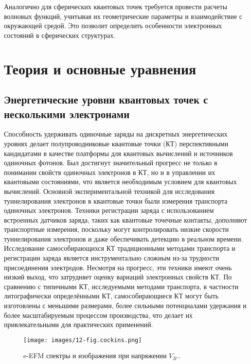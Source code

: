 \documentclass[a4paper,14pt]{extarticle}
\begin{document}
Аналогично для сферических квантовых точек требуется провести расчеты волновых функций, учитывая их геометрические параметры и взаимодействие с окружающей средой. Это позволит определить особенности электронных состояний в сферических структурах.

\pagebreak
\section{Теория и основные уравнения}

\subsection{Энергетические уровни квантовых точек с несколькими электронами}

Способность удерживать одиночные заряды на дискретных энергетических уровнях делает полупроводниковые квантовые точки (КТ) перспективными кандидатами в качестве платформы для квантовых вычислений и источников одиночных фотонов. Был достигнут значительный прогресс не только в понимании свойств одиночных электронов в КТ, но и в управлении их квантовыми состояниями, что является необходимым условием для квантовых вычислений. Основной экспериментальной техникой для исследования туннелирования электронов в квантовые точки были измерения транспорта одиночных электронов. Техники регистрации заряда с использованием встроенных датчиков заряда, таких как квантовые точечные контакты, дополняют транспортные измерения, поскольку могут контролировать низкие скорости туннелирования электронов и даже обеспечивать детекцию в реальном времени. Исследование самособирающихся КТ традиционными методами транспорта и регистрации заряда является инструментально сложным из-за трудности присоединения электродов. Несмотря на прогресс, эти техники имеют очень низкий выход, что затрудняет оценку вариаций электронных свойств КТ. По сравнению с типичными КТ, исследуемыми методами транспорта, в частности литографически определёнными КТ, самособирающиеся КТ могут быть изготовлены с меньшими размерами, более сильными потенциалами удержания и более масштабируемым процессом производства, что делает их привлекательными для практических применений.

\begin{figure}[htbp]
    \centering
    \texttt{[image: images/12-fig.cockins.png]}
    \caption{\label{fig:cockins1} e-EFM спектры и изображения при напряжении $V_B$.\cite{cockins}.}
\end{figure}
\end{document}
